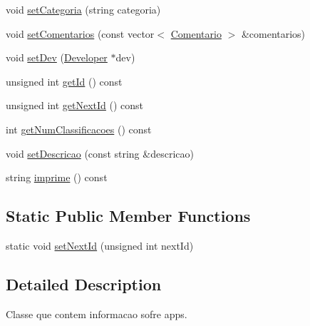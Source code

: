 \begin{DoxyCompactItemize}
\item 
void \hyperlink{class_app_add85e6926cb052edac84f210889df476}{set\+Categoria} (string categoria)
\item 
void \hyperlink{class_app_a40d8afcc9663054f4f5445a37dfd542d}{set\+Comentarios} (const vector$<$ \hyperlink{class_comentario}{Comentario} $>$ \&comentarios)
\item 
void \hyperlink{class_app_aa2d4de1233b4a07def3cdae0d165d4cf}{set\+Dev} (\hyperlink{class_developer}{Developer} $\ast$dev)
\item 
unsigned int \hyperlink{class_app_a17d1e4e52f2357b25437d21d21728bcb}{get\+Id} () const 
\item 
unsigned int \hyperlink{class_app_ae8bc0359346587f5e98885e4bdba3db0}{get\+Next\+Id} () const 
\item 
int \hyperlink{class_app_afca72f5119a5fbb1c7972d8085abc2c7}{get\+Num\+Classificacoes} () const 
\item 
void \hyperlink{class_app_af0140ea32801ddf481e61fda65024ba8}{set\+Descricao} (const string \&descricao)
\item 
string \hyperlink{class_app_af3a98845da9ba10769df22e1e21f3db0}{imprime} () const 
\end{DoxyCompactItemize}
\subsection*{Static Public Member Functions}
\begin{DoxyCompactItemize}
\item 
static void \hyperlink{class_app_ac02dab3cd7642d98173bfd6365eb6d9e}{set\+Next\+Id} (unsigned int next\+Id)
\end{DoxyCompactItemize}


\subsection{Detailed Description}
Classe que contem informacao sofre apps. 

